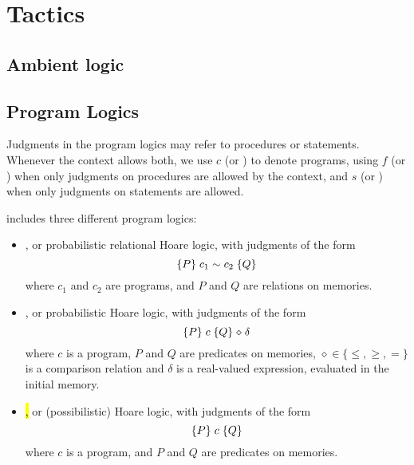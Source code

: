 \section{Tactics}

\subsection{Ambient logic}












































\subsection{Program Logics}

Judgments in the program logics may refer to procedures or
statements. Whenever the context allows both, we use $c$ (or )
to denote programs, using $f$ (or ) when only judgments on
procedures are allowed by the context, and $s$ (or ) when only
judgments on statements are allowed.

\EasyCrypt includes three different program logics:
\begin{itemize}
\item \prhl, or probabilistic relational Hoare logic, with judgments of the form
$$\{P\}\; c_1 \mathrel{\sim} c_2\; \{Q\}$$
where $c_1$ and $c_2$ are programs, and $P$ and $Q$
are relations on memories.
\item \phl, or probabilistic Hoare logic, with judgments of the form
$$\{P\}\; c\; \{Q\} \mathrel{\diamond} \delta$$
where $c$ is a program, $P$ and $Q$ are predicates on memories,
$\diamond\in\{\leq,\geq,=\}$ is a comparison relation and $\delta$ is
a real-valued expression, evaluated in the initial memory.
\item \hl, or (possibilistic) Hoare logic, with judgments of the form
$$\{P\}\; c\; \{Q\}$$
where $c$ is a program, and $P$ and $Q$ are predicates on memories.
\end{itemize}

